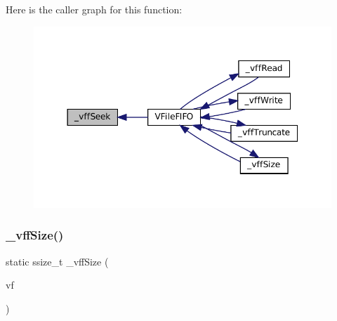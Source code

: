 Here is the caller graph for this function\+:
\nopagebreak
\begin{figure}[H]
\begin{center}
\leavevmode
\includegraphics[width=350pt]{vfs-fifo_8c_a7e56f8b931c2f4d604b1060e0e641210_icgraph}
\end{center}
\end{figure}
\mbox{\label{vfs-fifo_8c_af0919c50f70e8df2e12ca7fb437a0b4b}} 
\subsubsection{\texorpdfstring{\+\_\+vff\+Size()}{\_vffSize()}}
{\footnotesize\ttfamily static ssize\+\_\+t \+\_\+vff\+Size (\begin{DoxyParamCaption}\item[{struct V\+File $\ast$}]{vf }\end{DoxyParamCaption})\hspace{0.3cm}{\ttfamily [static]}}

